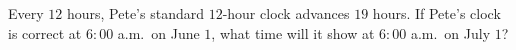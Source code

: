 Every $12$ hours, Pete's standard $12$-hour clock advances $19$ hours. If Pete's clock is correct at $6{:}00$ a.m.\ on June $1$, what time will it show at $6{:}00$ a.m.\ on July $1$?
